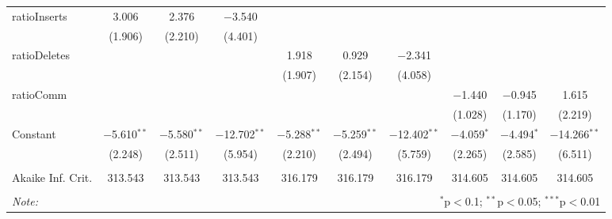 \documentclass{report}
\begin{document}
\begin{table}[!htbp]
\begin{tabular}{@{\extracolsep{5pt}}lccccccccc}
  ratioInserts & 3.006 & 2.376 & $-$3.540 &  &  &  &  &  &  \\ 
  & (1.906) & (2.210) & (4.401) &  &  &  &  &  &  \\ 
  ratioDeletes &  &  &  & 1.918 & 0.929 & $-$2.341 &  &  &  \\ 
  &  &  &  & (1.907) & (2.154) & (4.058) &  &  &  \\ 
  ratioComm &  &  &  &  &  &  & $-$1.440 & $-$0.945 & 1.615 \\ 
  &  &  &  &  &  &  & (1.028) & (1.170) & (2.219) \\ 
  Constant & $-$5.610$^{**}$ & $-$5.580$^{**}$ & $-$12.702$^{**}$ & $-$5.288$^{**}$ & $-$5.259$^{**}$ & $-$12.402$^{**}$ & $-$4.059$^{*}$ & $-$4.494$^{*}$ & $-$14.266$^{**}$ \\ 
  & (2.248) & (2.511) & (5.954) & (2.210) & (2.494) & (5.759) & (2.265) & (2.585) & (6.511) \\ 
 \hline \\[-1.8ex] 
Akaike Inf. Crit. & 313.543 & 313.543 & 313.543 & 316.179 & 316.179 & 316.179 & 314.605 & 314.605 & 314.605 \\ 
\hline 
\hline \\[-1.8ex] 
\textit{Note:}  & \multicolumn{9}{r}{$^{*}$p$<$0.1; $^{**}$p$<$0.05; $^{***}$p$<$0.01} \\ 
\end{tabular} 
\end{table}
\end{document}
